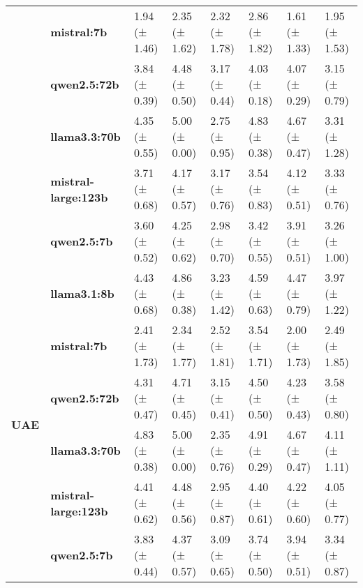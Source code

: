 \begin{tabular}{llllllll}
\textbf{} & \textbf{mistral:7b} & 1.94 (± 1.46) & 2.35 (± 1.62) & 2.32 (± 1.78) & 2.86 (± 1.82) & 1.61 (± 1.33) & 1.95 (± 1.53) \\
\textbf{} & \textbf{qwen2.5:72b} & 3.84 (± 0.39) & 4.48 (± 0.50) & 3.17 (± 0.44) & 4.03 (± 0.18) & 4.07 (± 0.29) & 3.15 (± 0.79) \\
\textbf{} & \textbf{llama3.3:70b} & 4.35 (± 0.55) & 5.00 (± 0.00) & 2.75 (± 0.95) & 4.83 (± 0.38) & 4.67 (± 0.47) & 3.31 (± 1.28) \\
\textbf{} & \textbf{mistral-large:123b} & 3.71 (± 0.68) & 4.17 (± 0.57) & 3.17 (± 0.76) & 3.54 (± 0.83) & 4.12 (± 0.51) & 3.33 (± 0.76) \\
\textbf{} & \textbf{qwen2.5:7b} & 3.60 (± 0.52) & 4.25 (± 0.62) & 2.98 (± 0.70) & 3.42 (± 0.55) & 3.91 (± 0.51) & 3.26 (± 1.00) \\
\cline{1-8}
\multirow[t]{6}{*}{\textbf{UAE}} & \textbf{llama3.1:8b} & 4.43 (± 0.68) & 4.86 (± 0.38) & 3.23 (± 1.42) & 4.59 (± 0.63) & 4.47 (± 0.79) & 3.97 (± 1.22) \\
\textbf{} & \textbf{mistral:7b} & 2.41 (± 1.73) & 2.34 (± 1.77) & 2.52 (± 1.81) & 3.54 (± 1.71) & 2.00 (± 1.73) & 2.49 (± 1.85) \\
\textbf{} & \textbf{qwen2.5:72b} & 4.31 (± 0.47) & 4.71 (± 0.45) & 3.15 (± 0.41) & 4.50 (± 0.50) & 4.23 (± 0.43) & 3.58 (± 0.80) \\
\textbf{} & \textbf{llama3.3:70b} & 4.83 (± 0.38) & 5.00 (± 0.00) & 2.35 (± 0.76) & 4.91 (± 0.29) & 4.67 (± 0.47) & 4.11 (± 1.11) \\
\textbf{} & \textbf{mistral-large:123b} & 4.41 (± 0.62) & 4.48 (± 0.56) & 2.95 (± 0.87) & 4.40 (± 0.61) & 4.22 (± 0.60) & 4.05 (± 0.77) \\
\textbf{} & \textbf{qwen2.5:7b} & 3.83 (± 0.44) & 4.37 (± 0.57) & 3.09 (± 0.65) & 3.74 (± 0.50) & 3.94 (± 0.51) & 3.34 (± 0.87) \\
\cline{1-8}
\bottomrule
\end{tabular}
